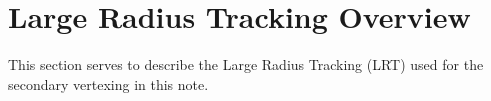 
%
\section{Large Radius Tracking Overview \label{sec:LRT} }
%

This section serves to describe the Large Radius Tracking (LRT) used for the secondary vertexing in this note.


